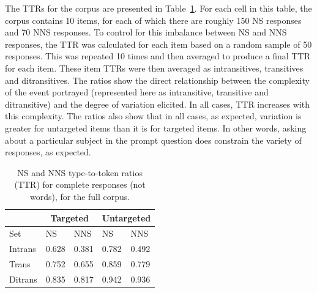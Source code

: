 
The TTRs for the corpus are presented in Table~\ref{tab:ttr}. 
For each cell in this table, the corpus contains 10 items, for each of which there are roughly 150 NS responses and 70 NNS responses. 
To control for this imbalance between NS and NNS responses, the TTR was calculated for each item based on a random sample of 50 responses.  This was repeated 10 times and then averaged to produce a final TTR for each item. These item TTRs were then averaged as intransitives, transitives and ditransitives. The ratios show the direct relationship between the complexity of the event portrayed (represented here as intransitive, transitive and ditransitive) and the degree of variation elicited. In all cases, TTR increases with this complexity.
The ratios also show that in all cases, as expected, variation is greater for untargeted items than it is for targeted items. In other words, asking about a particular subject in the prompt question does constrain the variety of responses, as expected.

\begin{table}[h!]
\begin{center}
\begin{tabular}{|l||l|l||l|l|}
\hline
 & \multicolumn{2}{|c||}{Targeted} & \multicolumn{2}{|c|}{Untargeted} \\
\hline
 Set & NS & NNS & NS & NNS \\
\hline
\hline
Intrans & 0.628 & 0.381 & 0.782 & 0.492 \\
\hline
Trans & 0.752 & 0.655 & 0.859 & 0.779 \\ %
\hline
Ditrans & 0.835 & 0.817 & 0.942 & 0.936 \\ 
\hline
\end{tabular}
\caption{\label{tab:ttr} NS and NNS type-to-token ratios (TTR) for complete responses (not words), for the full corpus.}
\end{center}
\end{table}

